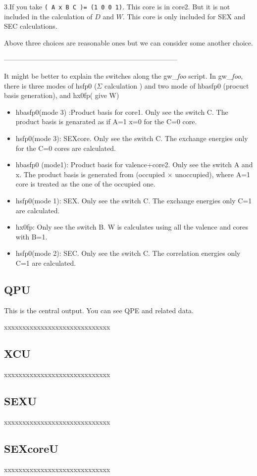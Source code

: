 \documentclass[a4paper,10pt,epsf,fleqn]{article}
\newcommand{\fx}[1]{\subsection{\sf #1\index{\sf #1}}}
\begin{document}
{\noindent 3.If you take
{\tt ( A  x   B    C )= (1 0 0 1)}.
This core is in core2. But it is not included in the calculation of $D$ and $W$.
This core is only included for SEX and SEC calculations.

\noindent Above three choices are reasonable ones but we can consider some another choice.

---------------------------------------------------------------------------

\vspace{1cm}
It might be better to explain the switches along the gw\_{\it foo} script.
In gw\_{\it foo}, there is three modes of hsfp0 ($\Sigma$ calculation ) 
and two mode of hbasfp0 (procuct basis generation), and hx0fp( give W)

\begin{itemize}
\item 
hbasfp0(mode 3) :Product basis for core1.
Only see the switch C.
The product basis is genarated as if A=1 x=0 for the C=0 core.

\item 
hsfp0(mode 3): SEXcore.
Only see the switch C. 
The exchange energies only for the C=0 cores are calculated.

\item 
hbasfp0 (mode1): Product basis for valence+core2.
Only see the switch A and x.
The product basis is generated from (occupied $\times$ unoccupied), where
A=1 core is treated as the one of the occupied one.

\item 
hsfp0(mode 1): SEX.
Only see the switch C.
The exchange energies only C=1 are calculated.

\item 
hx0fp:
Only see the switch B.
W is calculates using all the valence and cores with B=1.

\item 
hsfp0(mode 2): SEC.
Only see the switch C.
The correlation energies only C=1 are calculated.

\end{itemize}


\fx{QPU}
This is the central output. You can see QPE and related data.

xxxxxxxxxxxxxxxxxxxxxxxxxxxxx

\fx{XCU}
xxxxxxxxxxxxxxxxxxxxxxxxxxxxx

\fx{SEXU}
xxxxxxxxxxxxxxxxxxxxxxxxxxxxx

\fx{SEXcoreU}
xxxxxxxxxxxxxxxxxxxxxxxxxxxxx

}
\end{document}
